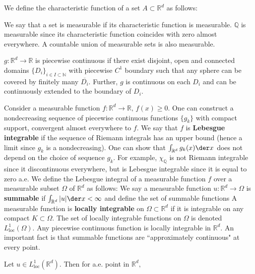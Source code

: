 We define the characteristic function of a set $A\subset \mathbb{R}^d$ as follows:

We say that a set is measurable if its characteristic function is measurable. $\mathbb{Q}$ is measurable since its characteristic function coincides with zero almost everywhere. A countable union of measurable sets is also measurable.

\begin{definition}
    $g:\mathbb{R}^d\rightarrow \mathbb{R}$ is piecewise continuous if there exist disjoint, open and connected domains $\{D_i\}_{i\in I\subset\mathbb{N}}$ with piecewise $C^1$ boundary such that any sphere can be covered by finitely many $\overline{D_i}.$ Further, $g$ is continuous on each $D_i$ and can be continuously extended to the boundary of $D_i.$
\end{definition}

Consider a measurable function $f:\mathbb{R}^d\rightarrow\mathbb{R},\,f(x)\geq0.$ One can construct a nondecreasing sequence of piecewise continuous functions $\{g_k\}$ with compact support, convergent almost everywhere to $f.$ We say that $f$ is \textbf{Lebesgue integrable} if the sequence of Riemann integrals
has an upper bound (hence a limit since $g_k$ is a nondecreasing). One can show that $\int_{\mathbb{R}^d}g_k(x)\der x$ does not depend on the choice of sequence $g_k.$
For example, $\chi_{\mathbb{Q}}$ is not Riemann integrable since it discontinuous everywhere, but is Lebesgue integrable since it is equal to zero a.e. We define the Lebesgue integral of a measurable function $f$ over a measurable subset $\Omega$ of $\mathbb{R}^d$ as follows:
We say a measurable function $u:\mathbb{R}^d\rightarrow\Omega$ is \textbf{summable} if $\int_{\mathbb{R}^d}\abs{u}\der x < \infty$ and define the set of summable functions
A measurable function is \textbf{locally integrable} on $\Omega\subset\mathbb{R}^d$ if it is integrable on any compact $K\subset\Omega.$ The set of locally integrable functions on $\Omega$ is denoted $L^1_\mathrm{loc}(\Omega).$
Any piecewise continuous function is locally integrable in $\mathbb{R}^d.$ An important fact is that summable functions are ``approximately continuous" at every point.
\begin{theorem}
    Let $u\in L^1_\mathrm{loc}(\mathbb{R}^d).$ Then for a.e. point in $\mathbb{R}^d,$
\end{theorem}
